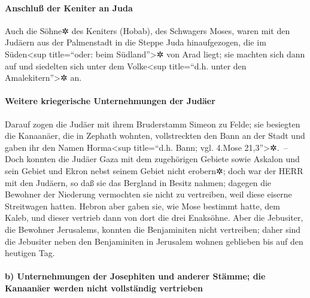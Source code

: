 \hypertarget{anschluuxdf-der-keniter-an-juda}{%
\paragraph{Anschluß der Keniter an
Juda}\label{anschluuxdf-der-keniter-an-juda}}

Auch die Söhne✲ des Keniters (Hobab), des Schwagers
Moses, waren mit den Judäern aus der Palmenstadt in die Steppe Juda
hinaufgezogen, die im Süden\textless sup title=``oder: beim
Südland''\textgreater✲ von Arad liegt; sie machten sich dann auf und
siedelten sich unter dem Volke\textless sup title=``d.h. unter den
Amalekitern''\textgreater✲ an.

\hypertarget{weitere-kriegerische-unternehmungen-der-juduxe4er}{%
\paragraph{Weitere kriegerische Unternehmungen der
Judäer}\label{weitere-kriegerische-unternehmungen-der-juduxe4er}}

Darauf zogen die Judäer mit ihrem Bruderstamm Simeon zu
Felde; sie besiegten die Kanaanäer, die in Zephath wohnten,
vollstreckten den Bann an der Stadt und gaben ihr den Namen
Horma\textless sup title=``d.h. Bann; vgl. 4.Mose
21,3''\textgreater✲.~-- Doch konnten die Judäer Gaza mit
dem zugehörigen Gebiete sowie Askalon und sein Gebiet und Ekron nebst
seinem Gebiet nicht erobern✲; doch war der HERR mit den
Judäern, so daß sie das Bergland in Besitz nahmen; dagegen die Bewohner
der Niederung vermochten sie nicht zu vertreiben, weil diese eiserne
Streitwagen hatten. Hebron aber gaben sie, wie Mose
bestimmt hatte, dem Kaleb, und dieser vertrieb dann von dort die drei
Enaksöhne. Aber die Jebusiter, die Bewohner Jerusalems,
konnten die Benjaminiten nicht vertreiben; daher sind die Jebusiter
neben den Benjaminiten in Jerusalem wohnen geblieben bis auf den
heutigen Tag.

\hypertarget{b-unternehmungen-der-josephiten-und-anderer-stuxe4mme-die-kanaanuxe4er-werden-nicht-vollstuxe4ndig-vertrieben}{%
\paragraph{b) Unternehmungen der Josephiten und anderer Stämme; die
Kanaanäer werden nicht vollständig
vertrieben}\label{b-unternehmungen-der-josephiten-und-anderer-stuxe4mme-die-kanaanuxe4er-werden-nicht-vollstuxe4ndig-vertrieben}}

